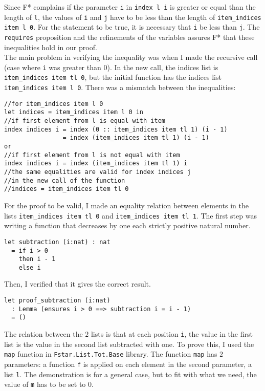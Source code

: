Since F* complains if the parameter \texttt{i} in \texttt{index l i} is greater or equal than the length of \texttt{l}, the values of \texttt{i} and \texttt{j} have to be less than the length of \texttt{item\_indices item l 0}. For the statement to be true, it is necessary that \texttt{i} be less than \texttt{j}. The \texttt{requires} proposition and the refinements of the variables assures F* that these inequalities hold in our proof. \\
\indent The main problem in verifying the inequality was when I made the recursive call (case where \texttt{i} was greater than \(0\)). In the new call, the indices list is \texttt{item\_indices item tl 0}, but the initial function has the indices list \texttt{item\_indices item l 0}. There was a mismatch between the inequalities: 

\begin{verbatim}
//for item_indices item l 0
let indices = item_indices item l 0 in 
//if first element from l is equal with item
index indices i = index (0 :: item_indices item tl 1) (i - 1)
                = index (item_indices item tl 1) (i - 1) 
or
//if first element from l is not equal with item
index indices i = index (item_indices item tl 1) i
//the same equalities are valid for index indices j
//in the new call of the function 
//indices = item_indices item tl 0
\end{verbatim}

For the proof to be valid, I made an equality relation between elements in the lists \texttt{item\_indices item tl 0} and \texttt{item\_indices item tl 1}. The first step was writing a function that decreases by one each strictly positive natural number.

\begin{verbatim}
let subtraction (i:nat) : nat 
  = if i > 0 
    then i - 1
    else i
\end{verbatim}

Then, I verified that it gives the correct result.

\begin{verbatim}
let proof_subtraction (i:nat)
  : Lemma (ensures i > 0 ==> subtraction i = i - 1)
  = ()
\end{verbatim}

The relation between the \(2\) lists is that at each position \texttt{i}, the value in the first list is the value in the second list subtracted with one. To prove this, I used the \texttt{map} function in \texttt{Fstar.List.Tot.Base} library. The function \texttt{map} has \(2\) parameters: a function \texttt{f} is applied on each element in the second parameter, a list \texttt{l}. The demonstration is for a general case, but to fit with what we need, the value of \texttt{m} has to be set to \(0\).

